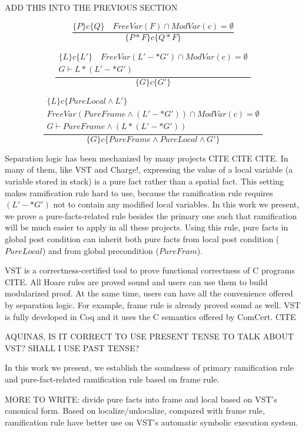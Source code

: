 ADD THIS INTO THE PREVIOUS SECTION

$$ \frac{\{ P \} c \{Q \} \quad FreeVar(F) \cap ModVar(c) = \emptyset } {\{P * F \} c \{ Q * F \}} $$

\[
\frac{
\begin{array}{c}
\{ L \} c \{L' \} \quad FreeVar(L' -* G') \cap ModVar(c) = \emptyset \\
G \vdash L * (L' -* G')
\end{array}
}
{\{G \} c \{ G' \}}
\]

\[
\frac
{
\begin{array}{c}
\{ L \} c \{PureLocal \wedge L' \} \\ 
FreeVar(PureFrame \wedge (L' -* G')) \cap ModVar(c) = \emptyset \\
G \vdash PureFrame \wedge (L * (L' -* G'))
\end{array}
} {\{G \} c \{ PureFrame \wedge PureLocal \wedge G' \}}
\]


Separation logic has been mechanized by many projects CITE CITE CITE. In many of them, like VST and Charge!, expressing the value of a local variable (a variable stored in stack) is a pure fact rather than a spatial fact. This setting makes ramification rule hard to use, because the ramification rule requires $(L' -* G')$ not to contain any modified local variables. In this work we present, we prove a pure-facts-related rule besides the primary one such that ramification will be much easier to apply in all these projects. Using this rule, pure facts in global post condition can inherit both pure facts from local post condition (${PureLocal}$) and from global precondition (${PureFram}$).



VST is a correctness-certified tool to prove functional correctness of C programs CITE. All Hoare rules are proved sound and users can use them to build modularized proof. At the same time, users can have all the convenience offered by separation logic. For example, frame rule is already proved sound as well. VST is fully developed in Coq and it uses the C semantics offered by ComCert. CITE

AQUINAS, IS IT CORRECT TO USE PRESENT TENSE TO TALK ABOUT VST? SHALL I USE PAST TENSE?

In this work we present, we establish the soundness of primary ramification rule and pure-fact-related ramification rule based on frame rule. 	


MORE TO WRITE: divide pure facts into frame and local based on VST's canonical form. Based on localize/unlocalize, compared with frame rule, ramification rule have better use on VST's automatic symbolic execution system.





